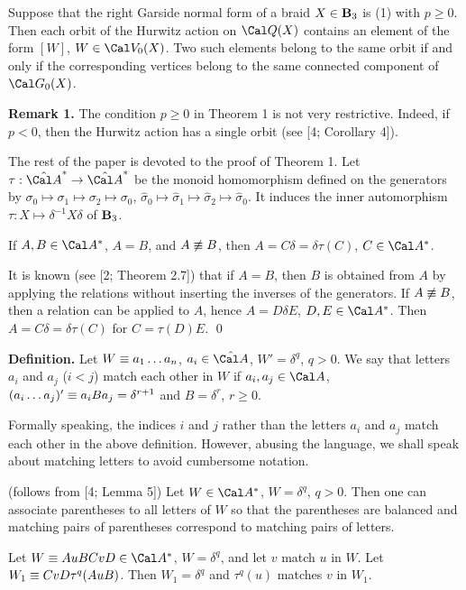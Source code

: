  Suppose that the right Garside normal form of a braid
$X\in\bold B_3$ is {\rm(1)} with $p\ge0$.
Then each orbit of the Hurwitz action on $\Cal Q(X)$ contains an element of the form
$[W]$, $W\in\Cal V_0(X)$. Two such elements belong to the same orbit if and only if
the corresponding vertices belong to the same connected component of $\Cal G_0(X)$.
\endproclaim

\noindent
{\bf Remark 1.} The condition $p\ge 0$ in Theorem 1 is not very restrictive. Indeed,
if $p<0$, then the Hurwitz action has a single orbit (see [4; Corollary 4]).

\medskip
The rest of the paper is devoted to the proof of Theorem 1.
Let $\tau:\hA^*\to\hA^*$ be the monoid homomorphism defined on the generators by
$\sigma_0\mapsto\sigma_1\mapsto\sigma_2\mapsto\sigma_0$,
$\hat\sigma_0\mapsto\hat\sigma_1\mapsto\hat\sigma_2\mapsto\hat\sigma_0$.
It induces the inner automorphism
$\tau:X\mapsto\delta^{-1}X\delta$ of $\bold B_3$.


 If $A,B\in\Cal A^*$, $A=B$, and $A\not\equiv B$,
then $A=C\delta=\delta\tau(C)$, $C\in\Cal A^*$.
\endproclaim

It is known (see [2; Theorem 2.7]) that if $A=B$, then $B$ is obtained from
$A$ by applying the relations without inserting the inverses of the generators.
If $A\not\equiv B$, then a relation can be applied to $A$, hence
$A=D\delta E$, $D,E\in\Cal A^*$.
Then $A=C\delta=\delta\tau(C)$ for $C=\tau(D)E$. \qed
\enddemo

\medskip\noindent
{\bf Definition.}
Let $W\equiv a_1\dots a_n$, $a_i\in\hat{\Cal A}$, $W'=\delta^q$, $q>0$.
We say that letters $a_i$ and $a_j$ ($i<j$) match each other
in $W$ if $a_i,a_j\in\Cal A$,
$(a_i\dots a_j)'\equiv a_iBa_j=\delta^{r+1}$
and $B=\delta^r$, $r\ge0$.
\medskip

Formally speaking, the indices $i$ and $j$ rather than the letters $a_i$ and $a_j$
match each other in the above definition. However, abusing the language, we shall
speak about matching letters to avoid cumbersome notation.

 {\rm(follows from [4; Lemma 5])}
Let $W\in\Cal A^*$, $W=\delta^q$, $q>0$. Then one can associate
parentheses to all letters of $W$ so that the parentheses are balanced
and matching pairs of parentheses correspond to matching pairs of letters.
\endproclaim

Let $W\letterwise AuBCvD\in\Cal A^*$, $W=\delta^q$, and
let $v$ match $u$ in $W$. Let $W_1\equiv CvD\tau^q(AuB)$.
Then $W_1=\delta^q$ and $\tau^q(u)$ matches $v$ in $W_1$.
\endproclaim


